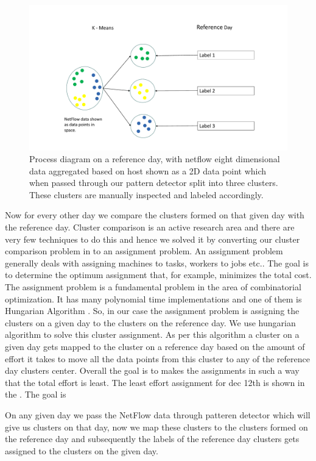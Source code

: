 \begin{figure}[t]
	\centerline{\includegraphics[scale = 0.5]{cluster_comp.pdf}}
	\caption{Process diagram on a reference day, with netflow eight dimensional data aggregated based on host shown as a 2D data point which when passed through our pattern detector split into three clusters. These clusters are manually inspected and labeled accordingly. }%
\end{figure}

 Now for every other day we compare the clusters formed on that given day with the reference day. Cluster comparison is an active research area and there are very few techniques to do this and hence we solved it by converting our cluster comparison problem in to an assignment problem. An assignment problem generally deals with assigning machines to tasks, workers to jobs etc.. The goal is to determine the optimum assignment that, for example, minimizes the total cost. The assignment problem is a fundamental problem in the area of combinatorial optimization. It has many polynomial time implementations and one of them is Hungarian Algorithm \cite{}. So, in our case the assignment problem is assigning the clusters on a given day to the clusters on the reference day. We use hungarian algorithm to solve this cluster assignment. As per this algorithm a cluster on a given day gets mapped to the cluster on a reference day based on the amount of effort it takes to move all the data points from this cluster to any of the reference day clusters center. Overall the goal is to makes the assignments in such a way that the total effort is least. The least effort assignment for dec 12th is shown in the . The goal is 
 
 On any given day we pass the NetFlow data through patteren detector which will give us clusters on that day, now we map these clusters to the clusters formed on the reference day and subsequently the labels of the reference day clusters gets assigned to the clusters on the given day. 
 

